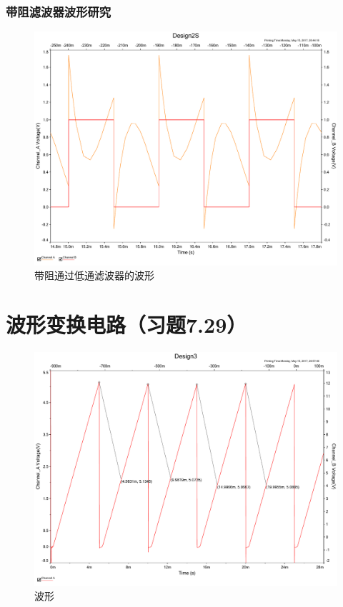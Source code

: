 \documentclass[UTF8,a4paper]{paper}
\begin{document}
\subsubsection{带阻滤波器波形研究}
\begin{figure}
\centering
\includegraphics[width=\textwidth]{2S.pdf}
\caption{带阻通过低通滤波器的波形}
\label{BIS}
\end{figure}
\section{波形变换电路（习题7.29）}
\begin{figure}
\centering
\includegraphics[width=\textwidth]{wave3.pdf}
\caption{波形}
\label{wave3}
\end{figure}
\end{document}
